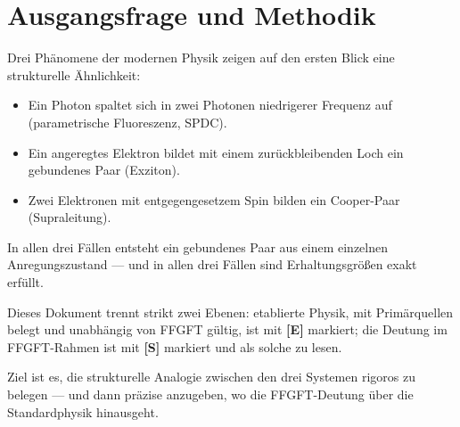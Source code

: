 %

\providecommand{\ket}[1]{\left|#1\right\rangle}
\providecommand{\bra}[1]{\left\langle#1\right|}

\section{Ausgangsfrage und Methodik}
\label{sec:ausgangsfrage}

Drei Phänomene der modernen Physik zeigen auf den ersten Blick
eine strukturelle Ähnlichkeit:

\begin{itemize}
  \item Ein Photon spaltet sich in zwei Photonen niedrigerer Frequenz auf
    (parametrische Fluoreszenz, SPDC).
  \item Ein angeregtes Elektron bildet mit einem zurückbleibenden
    Loch ein gebundenes Paar (Exziton).
  \item Zwei Elektronen mit entgegengesetzem Spin bilden
    ein Cooper-Paar (Supraleitung).
\end{itemize}

In allen drei Fällen entsteht ein gebundenes Paar aus einem
einzelnen Anregungszustand --- und in allen drei Fällen sind
Erhaltungsgrößen exakt erfüllt.

\begin{important}
Dieses Dokument trennt strikt zwei Ebenen: etablierte Physik, mit Primärquellen belegt und unabhängig von FFGFT gültig, ist mit \textbf{[E]} markiert; die Deutung im FFGFT-Rahmen ist mit \textbf{[S]} markiert und als solche zu lesen.



Ziel ist es, die strukturelle Analogie zwischen den drei Systemen
rigoros zu belegen --- und dann präzise anzugeben,
wo die FFGFT-Deutung über die Standardphysik hinausgeht.
\end{important}


